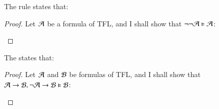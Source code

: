 \documentclass[12pt, a4paper, oneside, openright, titlepage]{book}
\begin{document}
\begin{defn}
    The  rule states that: \begin{fitchproof}
         
    \end{fitchproof}
\end{defn}
\begin{proof}
    Let $\mathcal{A}$ be a formula of TFL, and I shall show that $\neg\neg\mathcal{A}\vDash \mathcal{A}$:
    \begin{fitchproof}
        \open
             
        \close
         
    \end{fitchproof}
\end{proof}


\begin{defn}
    The  states that: \begin{fitchproof}
        \open
        \close
        \open 
        \close
         
    \end{fitchproof}
\end{defn}
\begin{proof}
    Let $\mathcal{A}$ and $\mathcal{B}$ be formulas of TFL, and I shall show that $\mathcal{A}\rightarrow\mathcal{B},\neg\mathcal{A}\rightarrow\mathcal{B}\vDash \mathcal{B}$:
    \begin{fitchproof}
        \open
             
             
             
        \close
         
    \end{fitchproof}
\end{proof}
\end{document}
